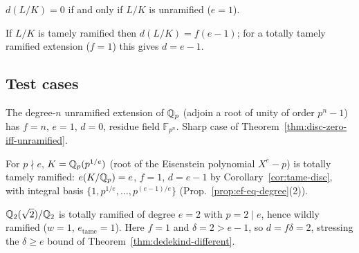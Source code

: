\begin{theorem}[$d=0\iff$ unramified]
\label{thm:disc-zero-iff-unramified}
\notready
$d(L/K)=0$ if and only if $L/K$ is unramified ($e=1$).
\end{theorem}

\begin{corollary}
\label{cor:tame-disc}
\notready
If $L/K$ is tamely ramified then $d(L/K)=f(e-1)$; for a totally tamely ramified
extension ($f=1$) this gives $d=e-1$.
\end{corollary}

\subsection{Test cases}
\label{subsec:tests}

\begin{example}
\label{ex:unramified}
\notready
The degree-$n$ unramified extension of $\mathbb{Q}_p$ (adjoin a root of unity of order
$p^n-1$) has $f=n$, $e=1$, $d=0$, residue field $\mathbb{F}_{p^n}$. Sharp case of
Theorem~\ref{thm:disc-zero-iff-unramified}.
\end{example}

\begin{example}
\label{ex:tame}
\notready
For $p\nmid e$, $K=\mathbb{Q}_p(p^{1/e})$ (root of the Eisenstein polynomial $X^e-p$) is
totally tamely ramified: $e(K/\mathbb{Q}_p)=e$, $f=1$, $d=e-1$ by
Corollary~\ref{cor:tame-disc}, with integral basis
$\{1,p^{1/e},\dots,p^{(e-1)/e}\}$ (Prop.~\ref{prop:ef-eq-degree}(2)).
\end{example}

\begin{example}
\label{ex:wild}
\notready
$\mathbb{Q}_2(\sqrt2)/\mathbb{Q}_2$ is totally ramified of degree $e=2$ with $p=2\mid e$, hence
wildly ramified ($w=1$, $e_{\mathrm{tame}}=1$). Here $f=1$ and $\delta=2>e-1$, so
$d=f\delta=2$, stressing the $\delta\ge e$ bound of
Theorem~\ref{thm:dedekind-different}.
\end{example}


